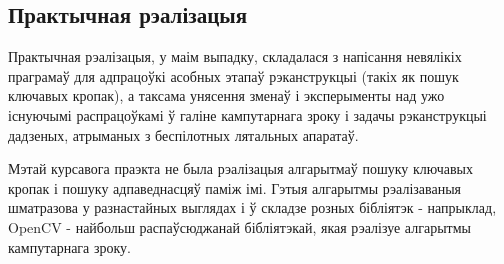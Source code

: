 \begin{center}
    \section*{Практычная рэалізацыя}    
\end{center}

Практычная рэалізацыя, у маім выпадку, складалася з напісання невялікіх праграмаў для адпрацоўкі асобных этапаў рэканструкцыі (такіх як пошук ключавых кропак), а таксама унясення зменаў і эксперыменты над ужо існуючымі распрацоўкамі ў галіне кампутарнага зроку і задачы рэканструкцыі дадзеных, атрыманых з беспілотных лятальных апаратаў.\par

\vspace{5mm}

Мэтай курсавога праэкта не была рэалізацыя алгарытмаў пошуку ключавых кропак і пошуку адпаведнасцяў паміж імі. Гэтыя алгарытмы рэалізаваныя шматразова у разнастайных выглядах і ў складзе розных бібліятэк - напрыклад, OpenCV - найбольш распаўсюджанай бібліятэкай, якая рэалізуе алгарытмы кампутарнага зроку.\par

\vspace{5mm}

